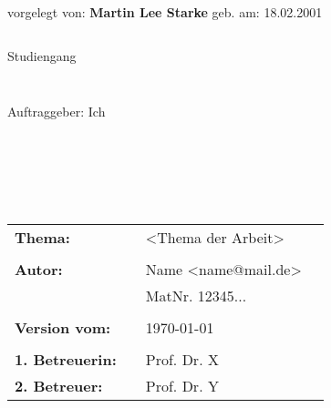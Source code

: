 \begin{center}
    \doublespacing
    vorgelegt von: \textbf{Martin Lee Starke} geb. am: 18.02.2001
    \singlespacing
    \begin{verbatim}

\end{verbatim}
    \normalsize{Studiengang \Studiengang}
\end{center}
\begin{verbatim}

\end{verbatim}
\begin{center}

\end{center}
\begin{verbatim}

\end{verbatim}
\begin{center}
    Auftraggeber:   Ich
\end{center}
\begin{verbatim}






\end{verbatim}
\begin{flushleft}
    \begin{tabular}{llll}
        \textbf{Thema:}         &  & <Thema der Arbeit>  & \\
                                &  &                       \\
        \textbf{Autor:}         &  & Name <name@mail.de> & \\
                                &  & MatNr. 12345...     & \\
                                &  &                       \\
        \textbf{Version vom:}   &  & \today              & \\
                                &  &                       \\
        \textbf{1. Betreuerin:} &  & Prof. Dr. X         & \\
        \textbf{2. Betreuer:}   &  & Prof. Dr. Y         & \\
    \end{tabular}
\end{flushleft}
